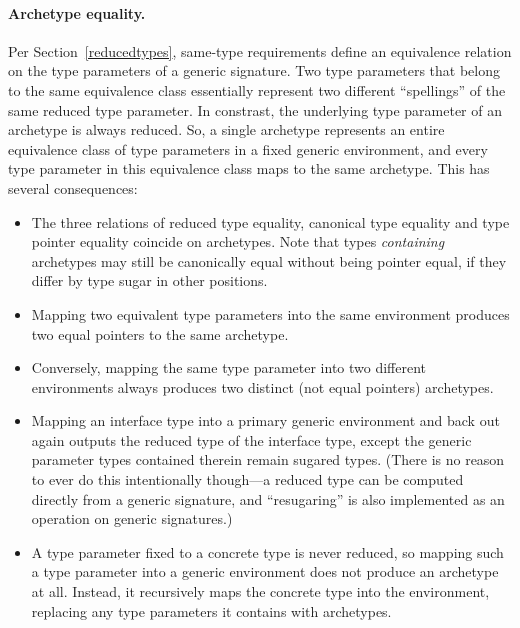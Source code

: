 \documentclass[../generics]{subfiles}
\begin{document}
\paragraph{Archetype equality.} Per Section~\ref{reducedtypes}, same-type requirements define an equivalence relation on the type parameters of a generic signature. Two type parameters that belong to the same equivalence class essentially represent two different ``spellings'' of the same reduced type parameter. In constrast, the underlying type parameter of an archetype is always reduced. So, a single archetype represents an entire equivalence class of type parameters in a fixed generic environment, and every type parameter in this equivalence class maps to the same archetype. This has several consequences:
\begin{itemize}
\item The three relations of reduced type equality, canonical type equality and type pointer equality coincide on archetypes. Note that types \emph{containing} archetypes may still be canonically equal without being pointer equal, if they differ by type sugar in other positions.

\item Mapping two equivalent type parameters into the same environment produces two equal pointers to the same archetype.

\item Conversely, mapping the same type parameter into two different environments always produces two distinct (not equal pointers) archetypes.

\item Mapping an interface type into a primary generic environment and back out again outputs the reduced type of the interface type, except the generic parameter types contained therein remain sugared types. (There is no reason to ever do this intentionally though---a reduced type can be computed directly from a generic signature, and ``resugaring'' is also implemented as an operation on generic signatures.)

\item A type parameter fixed to a concrete type is never reduced, so mapping such a type parameter into a generic environment does not produce an archetype at all. Instead, it recursively maps the concrete type into the environment, replacing any type parameters it contains with archetypes.
\end{itemize}
\end{document}
